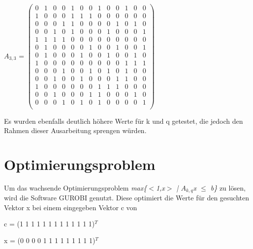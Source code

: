 \documentclass[12pt, titlepage]{article}
\begin{document}
\begin{center}
\item
$A_{3,3}$ = 		
$
\begin{pmatrix}
	0 & 1 & 0 & 0 & 1 & 0 & 0 & 1 & 0 & 0 & 1 & 0 & 0 \\
	1 & 0 & 0 & 0 & 1 & 1 & 1 & 0 & 0 & 0 & 0 & 0 & 0 \\
	0 & 0 & 0 & 1 & 1 & 0 & 0 & 0 & 0 & 1 & 0 & 1 & 0 \\
	0 & 0 & 1 & 0 & 1 & 0 & 0 & 0 & 1 & 0 & 0 & 0 & 1 \\
	1 & 1 & 1 & 1 & 0 & 0 & 0 & 0 & 0 & 0 & 0 & 0 & 0 \\
	0 & 1 & 0 & 0 & 0 & 0 & 1 & 0 & 0 & 1 & 0 & 0 & 1 \\
	0 & 1 & 0 & 0 & 0 & 1 & 0 & 0 & 1 & 0 & 0 & 1 & 0 \\
	1 & 0 & 0 & 0 & 0 & 0 & 0 & 0 & 0 & 0 & 1 & 1 & 1 \\
	0 & 0 & 0 & 1 & 0 & 0 & 1 & 0 & 1 & 0 & 1 & 0 & 0 \\
	0 & 0 & 1 & 0 & 0 & 1 & 0 & 0 & 0 & 1 & 1 & 0 & 0 \\
	1 & 0 & 0 & 0 & 0 & 0 & 0 & 1 & 1 & 1 & 0 & 0 & 0 \\
	0 & 0 & 1 & 0 & 0 & 0 & 1 & 1 & 0 & 0 & 0 & 1 & 0 \\
	0 & 0 & 0 & 1 & 0 & 1 & 0 & 1 & 0 & 0 & 0 & 0 & 1 \\
\end{pmatrix}
$
\end{center}

Es wurden ebenfalls deutlich höhere Werte für k und q getestet, die jedoch den Rahmen dieser Ausarbeitung sprengen würden.










\section{Optimierungsproblem}

Um das wachsende Optimierungsproblem \textit{max\{$<$1,x$>$ | $A_{k,q}$x $\leq$ b\}}  zu lösen, wird die Software GUROBI genutzt.
Diese optimiert die Werte für den gesuchten Vektor x bei einem eingegeben Vektor c von
\begin{center}
c = (1 1 1 1 1 1 1 1 1 1 1 1 1)$^T$

x = (0 0 0 0 1 1 1 1 1 1 1 1 1)$^T$
\end{center}
\end{document}
